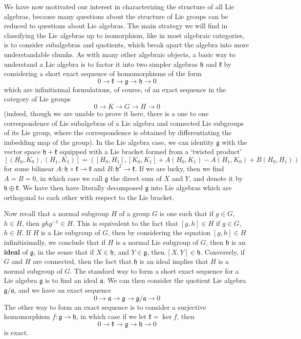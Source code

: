 We have now motivated  our interest in characterizing the structure of all Lie algebras, because many questions about the structure of Lie groups can be reduced to questions about Lie algebras. The main strategy we will find in classifying the Lie algebras up to isomorphism, like in most algebraic categories, is to consider subalgebras and quotients, which break apart the algebra into more understandable chunks. As with many other algebraic objects, a basic way to understand a Lie algebra is to factor it into two simpler algebras $\mathfrak{h}$ and $\mathfrak{k}$ by considering a short exact sequence of homomorphisms of the form
%
\[ 0 \to \mathfrak{k} \to \mathfrak{g} \to \mathfrak{h} \to 0 \]
%
which are infinitisimal formulations, of course, of an exact sequence in the category of Lie groups
%
\[ 0 \to K \to G \to H \to 0 \]
%
(indeed, though we are unable to prove it here, there is a one to one correspondence of Lie subalgebras of a Lie algebra and connected Lie subgroups of its Lie group, where the correspondence is obtained by differentiating the imbedding map of the group). In the Lie algebra case, we can identity $\mathfrak{g}$ with the vector space $\mathfrak{h} + \mathfrak{k}$ equipped with a Lie bracket formed from a `twisted product'
%
\[ [(H_0,K_0), (H_1,K_1)] = \left([H_0,H_1], [K_0,K_1] + A(H_0,K_1) - A(H_1,K_0) + B(H_0,H_1) \right) \]
%
for some bilinear $A: \mathfrak{h} \times \mathfrak{k} \to \mathfrak{k}$ and $B: \mathfrak{h}^2 \to \mathfrak{k}$. If we are lucky, then we find $A = B = 0$, in which case we call $\mathfrak{g}$ the direct sum of $X$ and $Y$, and denote it by $\mathfrak{h} \oplus \mathfrak{k}$. We have then have literally decomposed $\mathfrak{g}$ into Lie algebras which are orthogonal to each other with respect to the Lie bracket.

Now recall that a normal subgroup $H$ of a group $G$ is one such that if $g \in G$, $h \in H$, then $ghg^{-1} \in H$. This is equivalent to the fact that $[g,h] \in H$ if $g \in G$, $h \in H$. If $H$ is a Lie subgroup of $G$, then by considering the equation $[g,h] \in H$ infinitisimally, we conclude that if $H$ is a normal Lie subgroup of $G$, then $\mathfrak{h}$ is an {\bf ideal} of $\mathfrak{g}$, in the sense that if $X \in \mathfrak{h}$, and $Y \in \mathfrak{g}$, then $[X,Y] \in \mathfrak{h}$. Conversely, if $G$ and $H$ are connected, then the fact that $\mathfrak{h}$ is an ideal implies that $H$ is a normal subgroup of $G$. The standard way to form a short exact sequence for a Lie algebra $\mathfrak{g}$ is to find an ideal $\mathfrak{a}$. We can then consider the quotient Lie algebra $\mathfrak{g}/\mathfrak{a}$, and we have an exact sequence
%
\[ 0 \to \mathfrak{a} \to \mathfrak{g} \to \mathfrak{g}/\mathfrak{a} \to 0 \]
%
The other way to form an exact sequence is to consider a surjective homomorphism $f: \mathfrak{g} \to \mathfrak{h}$, in which case if we let $\mathfrak{k} = \ker f$, then
%
\[ 0 \to \mathfrak{k} \to \mathfrak{g} \to \mathfrak{h} \to 0 \]
%
is exact.

